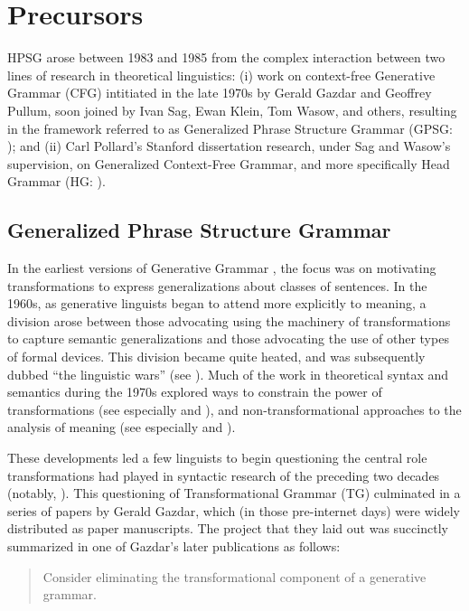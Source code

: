 \documentclass[output=paper
                ,modfonts
                ,nonflat
	        ,collection
	        ,collectionchapter
	        ,collectiontoclongg
 	        ,biblatex
                ,babelshorthands
                ,newtxmath
                ,draftmode
                ,colorlinks, citecolor=brown
]{./langsci/langscibook}
\begin{document}
\section{Precursors}

HPSG arose between 1983 and 1985 from the complex interaction between two lines of research in theoretical linguistics: (i) work on context-free Generative Grammar (CFG) intitiated in the late 1970s by Gerald Gazdar and Geoffrey Pullum, soon joined by Ivan Sag, Ewan Klein, Tom Wasow, and others, resulting in the framework referred to as Generalized Phrase Structure Grammar (GPSG: \citealt*{GKPS85a}); and (ii) Carl Pollard's Stanford dissertation research, under Sag and Wasow's supervision, on Generalized Context-Free Grammar, and more specifically Head Grammar (HG: \citealt{Pollard84a-u}).

\subsection{Generalized Phrase Structure Grammar}

In the earliest versions of Generative Grammar \citep{Chomsky57a}, the focus was on motivating transformations to express generalizations about classes of sentences.  In the 1960s, as generative linguists began to attend more explicitly to meaning, a division arose between those advocating using the machinery of transformations to capture semantic generalizations and those advocating the use of other types of formal devices.  This division became quite heated, and was subsequently dubbed ``the linguistic wars'' (see \citealt[Chapter 5]{Newmeyer:1980}).  Much of the work in theoretical syntax and semantics during the 1970s explored ways to constrain the power of transformations (see especially \citealt{Chomsky73a} and \citealt{ChomLas1977}), and non-transformational approaches to the analysis of meaning (see especially \citealt{Montague74a-ed} and \citealt{Dowty79a}).

These developments led a few linguists to begin questioning the central role transformations had played in syntactic research of the preceding two decades (notably, \citealt{Bresnan78a}).  This questioning of Transformational Grammar (TG) culminated in a series of papers by Gerald Gazdar, which (in those pre-internet days) were widely distributed as paper manuscripts.  The project that they laid out was succinctly summarized in one of Gazdar's later publications as follows:

\begin{quote}
Consider eliminating the transformational component of a generative grammar. \citep[]{Gazdar81a}
\end{quote}
\end{document}
